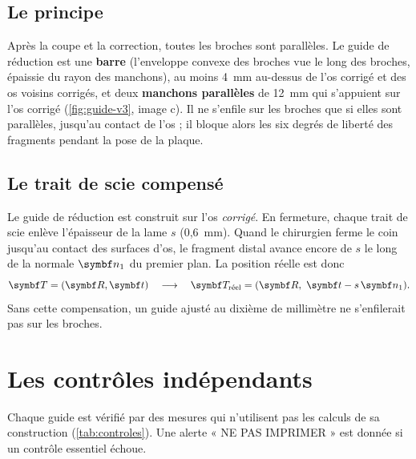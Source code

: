 \subsection{Le principe}

Après la coupe et la correction, toutes les broches sont parallèles. Le guide de réduction est une \textbf{barre}
(l'enveloppe convexe des broches vue le long des broches, épaissie du rayon des manchons), au moins 4~mm au-dessus de
l'os corrigé et des os voisins corrigés, et deux \textbf{manchons parallèles} de 12~mm qui s'appuient sur l'os corrigé
(\cref{fig:guide-v3}, image c). Il ne s'enfile sur les broches que si elles sont parallèles, jusqu'au contact de l'os ;
il bloque alors les six degrés de liberté des fragments pendant la pose de la plaque.

\subsection{Le trait de scie compensé}

Le guide de réduction est construit sur l'os \emph{corrigé}. En fermeture, chaque trait de scie enlève l'épaisseur de
la lame $s$ (0,6~mm). Quand le chirurgien ferme le coin jusqu'au contact des surfaces d'os, le fragment distal avance
encore de $s$ le long de la normale $\vb{n}_1$ du premier plan. La position réelle est donc
\begin{equation}
  \mt{T} = (\mt{R}, \vb{t})
  \quad\longrightarrow\quad
  \mt{T}_{\text{réel}} = (\mt{R},\ \vb{t} - s\,\vb{n}_1).
\end{equation}
Sans cette compensation, un guide ajusté au dixième de millimètre ne s'enfilerait pas sur les broches.

\section{Les contrôles indépendants}

Chaque guide est vérifié par des mesures qui n'utilisent pas les calculs de sa construction (\cref{tab:controles}).
Une alerte « NE PAS IMPRIMER » est donnée si un contrôle essentiel échoue.

